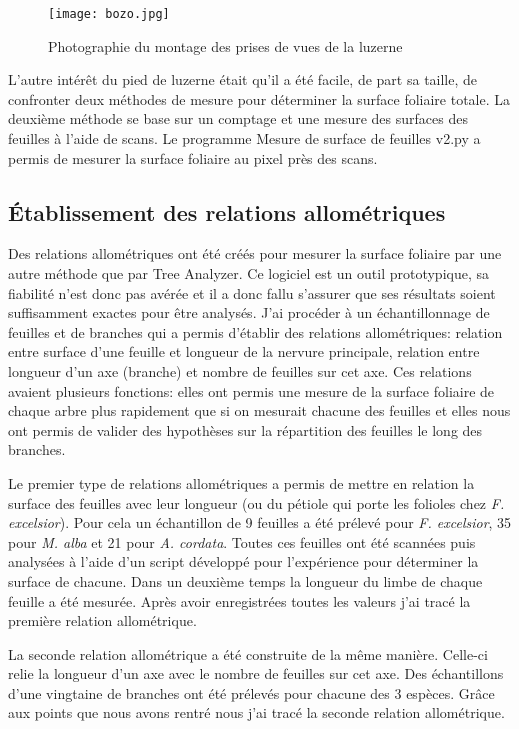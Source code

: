 \documentclass[12pt]{report}
\begin{document}
\begin{figure}
  \centering
  \texttt{[image: bozo.jpg]}
  \caption{Photographie du montage des prises de vues de la luzerne\label{fig:luzerne}}
\end{figure}

L'autre intérêt du pied de luzerne était qu'il a été facile, de part sa taille, de confronter deux
méthodes de mesure pour déterminer la surface foliaire totale. La deuxième
méthode se base sur un comptage et une mesure des surfaces des feuilles à l'aide
de scans. Le programme Mesure de surface de feuilles v2.py\citep{Python_ref40}
a permis de mesurer la surface foliaire au pixel près des scans.


\subsection{Établissement des relations allométriques}

Des relations allométriques ont été créés pour mesurer la surface foliaire par
une autre méthode que par Tree Analyzer. Ce logiciel est un outil prototypique,
sa fiabilité n'est donc pas avérée et il a donc fallu s'assurer que ses
résultats soient suffisamment exactes pour être analysés. J'ai procéder à
un échantillonnage de feuilles et de branches qui a permis d'établir des relations
allométriques: relation entre surface d'une feuille et longueur de la nervure
principale, relation entre longueur d'un axe (branche) et nombre de feuilles sur
cet axe. Ces relations avaient plusieurs fonctions: elles
ont permis une mesure de la surface foliaire de chaque arbre plus rapidement que
si on mesurait chacune des feuilles et elles nous ont permis de valider des
hypothèses sur la répartition des feuilles le long des branches.

Le premier type de relations allométriques a permis de mettre en relation la surface
des feuilles avec leur longueur (ou du pétiole qui porte les
folioles chez \textit{F. excelsior}). Pour cela un échantillon de 9 feuilles a
été prélevé pour \textit{F. excelsior}, 35 pour \textit{M. alba} et 21 pour \textit{A. cordata}.
Toutes ces feuilles ont été scannées puis analysées à l'aide d'un script développé
pour l'expérience pour déterminer la surface de chacune. Dans un deuxième temps
la longueur du limbe de chaque feuille a été mesurée. Après avoir enregistrées
toutes les valeurs j'ai tracé la première relation allométrique.

La seconde relation allométrique a été construite de la même manière. Celle-ci relie
la longueur d'un axe avec le nombre de feuilles sur cet axe. Des échantillons d'une
vingtaine de branches ont été prélevés pour chacune des 3 espèces. Grâce aux points
que nous avons rentré nous j'ai tracé la seconde relation allométrique.
\end{document}
